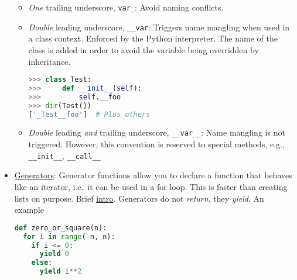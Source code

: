 \documentclass[a4paper,12pt,%
              final%
              ]{article}
\begin{document}
\begin{itemize}
\begin{itemize}
      \item \emph{One} trailing underscore, \verb|var_|: Avoid naming conflicts.
      \item \emph{Double} leading underscore, \verb|__var|: Triggers name mangling when used in a class context. Enforced by the Python interpreter. The name of the class is added in order to avoid the variable being overridden by inheritance.
\begin{lstlisting}[language=python]
>>> class Test:
>>>     def __init__(self):
>>>         self.__foo
>>> dir(Test())
['_Test__foo']  # Plus others
\end{lstlisting}
      \item \emph{Double} leading \emph{and} trailing underscore, \verb|__var__|: Name mangling is not triggered. However, this convention is reserved to special methods, e.g., \verb|__init__|, \verb|__call__|
    \end{itemize}
  \item \href{https://wiki.python.org/moin/Generators}{Generators}: Generator functions allow you to declare a function that behaves like an iterator, i.e.\ it can be used in a for loop. This is faster than creating lists on purpose. Brief \href{https://www.programiz.com/python-programming/generator}{intro}. Generators do not \emph{return}, they \emph{yield}. An example
\begin{lstlisting}[language=python]
def zero_or_square(n):
  for i in range(-n, n):
    if i <= 0:
      yield 0
    else:
      yield i**2


\end{lstlisting}
\end{itemize}
\end{document}
